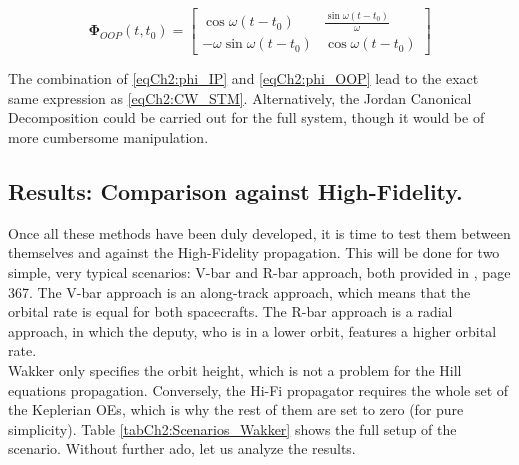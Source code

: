 		\begin{minipage}{0.3\linewidth}
		  	\begin{equation}
			\bm \Phi_{OOP}(t, t_0) = \left[ \begin{array}{cccc}
			\cos\omega(t - t_0)  & \frac{\sin\omega(t - t_0)}{\omega} 		\\
			-\omega\sin\omega(t - t_0)	& \cos\omega(t - t_0)
			\end{array}\right]
			\label{eqCh2:phi_OOP}
		  	\end{equation} 
	  	\end{minipage}
	  	\indent The combination of \eqref{eqCh2:phi_IP} and \eqref{eqCh2:phi_OOP} lead to the exact same expression as \eqref{eqCh2:CW_STM}. Alternatively, the Jordan Canonical Decomposition could be carried out for the full system, though it would be of more cumbersome manipulation.
	\subsection{Results: Comparison against High-Fidelity.}
	\indent Once all these methods have been duly developed, it is time to test them between themselves and against the High-Fidelity propagation. This will be done for two simple, very typical scenarios: V-bar and R-bar approach, both provided in \cite{Wakker}, page 367. The V-bar approach is an along-track approach, which means that the orbital rate is equal for both spacecrafts. The R-bar approach is a radial approach, in which the deputy, who is in a lower orbit, features a higher orbital rate.\\
	\indent Wakker \cite{Wakker} only specifies the orbit height, which is not a problem for the Hill equations propagation. Conversely, the Hi-Fi propagator requires the whole set of the Keplerian OEs, which is why the rest of them are set to zero (for pure simplicity). Table \ref{tabCh2:Scenarios_Wakker} shows the full setup of the scenario. Without further ado, let us analyze the results.
	
